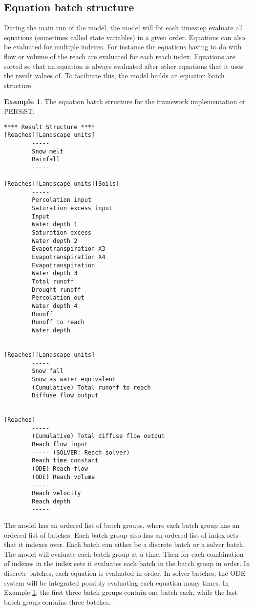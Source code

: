 \documentclass[11pt]{article}
\theoremstyle{definition}
\newtheorem{myexample}{Example}
\newenvironment{example}%
  {\begin{lrbox}{\examplebox}%
   \begin{minipage}{\dimexpr\linewidth-2\fboxsep}
   \begin{myexample}}%
  {\end{myexample}%
   \end{minipage}%
   \end{lrbox}%
   \begin{trivlist}
     \item[]\colorbox{silver}{\usebox\examplebox}
   \end{trivlist}}
\begin{document}
\subsection{Equation  batch structure}
During the main run of the model, the model will for each timestep evaluate all equations (sometimes called state variables) in a given order. Equations can also be evaluated for multiple indexes. For instance the equations having to do with flow or volume of the reach are evaluated for each reach index. Equations are sorted so that an equation is always evaluated after other equations that it uses the result values of. To facilitate this, the model builds an equation batch structure.

\begin{example}\label{ex:persiststructure}
The equation batch structure for the framework implementation of PERSiST.
\begin{lstlisting}[style=textstyle]
**** Result Structure ****
[Reaches][Landscape units]
        -----
        Snow melt
        Rainfall
        -----

[Reaches][Landscape units][Soils]
        -----
        Percolation input
        Saturation excess input
        Input
        Water depth 1
        Saturation excess
        Water depth 2
        Evapotranspiration X3
        Evapotranspiration X4
        Evapotranspiration
        Water depth 3
        Total runoff
        Drought runoff
        Percolation out
        Water depth 4
        Runoff
        Runoff to reach
        Water depth
        -----

[Reaches][Landscape units]
        -----
        Snow fall
        Snow as water equivalent
        (Cumulative) Total runoff to reach
        Diffuse flow output
        -----

[Reaches]
        -----
        (Cumulative) Total diffuse flow output
        Reach flow input
        ----- (SOLVER: Reach solver)
        Reach time constant
        (ODE) Reach flow
        (ODE) Reach volume
        -----
        Reach velocity
        Reach depth
        -----
\end{lstlisting}
\end{example}

The model has an ordered list of batch groups, where each batch group has an ordered list of batches. Each batch group also has an ordered list of index sets that it indexes over. Each batch can either be a discrete batch or a solver batch. The model will evaluate each batch group at a time. Then for each combination of indexes in the index sets it evaluates each batch in the batch group in order. In discrete batches, each equation is evaluated in order. In solver batches, the ODE system will be integrated possibly evaluating each equation many times. In Example \ref{ex:persiststructure}, the first three batch groups contain one batch each, while the last batch group contains three batches. 
\end{document}
